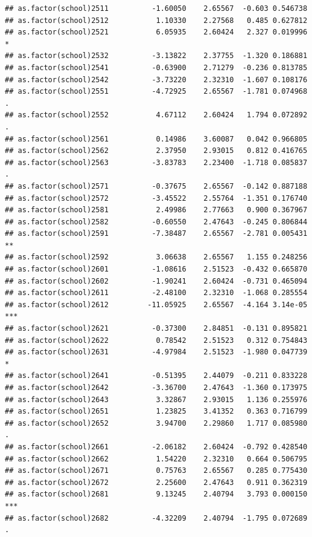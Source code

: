 \documentclass[ignorenonframetext,]{beamer}
\begin{document}
\begin{frame}[fragile]{}
\begin{verbatim}
## as.factor(school)2511          -1.60050    2.65567  -0.603 0.546738    
## as.factor(school)2512           1.10330    2.27568   0.485 0.627812    
## as.factor(school)2521           6.05935    2.60424   2.327 0.019996 *  
## as.factor(school)2532          -3.13822    2.37755  -1.320 0.186881    
## as.factor(school)2541          -0.63900    2.71279  -0.236 0.813785    
## as.factor(school)2542          -3.73220    2.32310  -1.607 0.108176    
## as.factor(school)2551          -4.72925    2.65567  -1.781 0.074968 .  
## as.factor(school)2552           4.67112    2.60424   1.794 0.072892 .  
## as.factor(school)2561           0.14986    3.60087   0.042 0.966805    
## as.factor(school)2562           2.37950    2.93015   0.812 0.416765    
## as.factor(school)2563          -3.83783    2.23400  -1.718 0.085837 .  
## as.factor(school)2571          -0.37675    2.65567  -0.142 0.887188    
## as.factor(school)2572          -3.45522    2.55764  -1.351 0.176740    
## as.factor(school)2581           2.49986    2.77663   0.900 0.367967    
## as.factor(school)2582          -0.60550    2.47643  -0.245 0.806844    
## as.factor(school)2591          -7.38487    2.65567  -2.781 0.005431 ** 
## as.factor(school)2592           3.06638    2.65567   1.155 0.248256    
## as.factor(school)2601          -1.08616    2.51523  -0.432 0.665870    
## as.factor(school)2602          -1.90241    2.60424  -0.731 0.465094    
## as.factor(school)2611          -2.48100    2.32310  -1.068 0.285554    
## as.factor(school)2612         -11.05925    2.65567  -4.164 3.14e-05 ***
## as.factor(school)2621          -0.37300    2.84851  -0.131 0.895821    
## as.factor(school)2622           0.78542    2.51523   0.312 0.754843    
## as.factor(school)2631          -4.97984    2.51523  -1.980 0.047739 *  
## as.factor(school)2641          -0.51395    2.44079  -0.211 0.833228    
## as.factor(school)2642          -3.36700    2.47643  -1.360 0.173975    
## as.factor(school)2643           3.32867    2.93015   1.136 0.255976    
## as.factor(school)2651           1.23825    3.41352   0.363 0.716799    
## as.factor(school)2652           3.94700    2.29860   1.717 0.085980 .  
## as.factor(school)2661          -2.06182    2.60424  -0.792 0.428540    
## as.factor(school)2662           1.54220    2.32310   0.664 0.506795    
## as.factor(school)2671           0.75763    2.65567   0.285 0.775430    
## as.factor(school)2672           2.25600    2.47643   0.911 0.362319    
## as.factor(school)2681           9.13245    2.40794   3.793 0.000150 ***
## as.factor(school)2682          -4.32209    2.40794  -1.795 0.072689 .  

\end{verbatim}
\end{frame}
\end{document}
